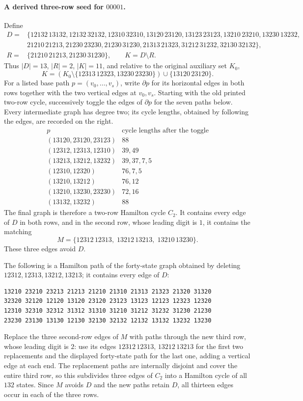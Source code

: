 \paragraph{A derived three-row seed for $00001$.}
Define
\[
\begin{split}
D={}&\{12132\,13132,12132\,32132,12310\,32310,
13120\,23120,13123\,23123,13210\,23210,13230\,13232,\\
&21210\,21213,21230\,23230,21230\,31230,
21313\,21323,31212\,31232,32130\,32132\},\\
R={}&\{21210\,21213,21230\,31230\},\qquad K=D\setminus R.
\end{split}
\]
Thus $|D|=13$, $|R|=2$, $|K|=11$, and relative to the original
auxiliary set $K_0$,
\[
K=(K_0\setminus\{12313\,12323,13230\,23230\})
   \cup\{13120\,23120\}.
\]
For a listed base path $p=(v_0,\ldots,v_s)$, write $\partial p$
for its horizontal edges in both rows together with the two
vertical edges at $v_0,v_s$. Starting with the old printed two-row
cycle, successively toggle the edges of $\partial p$ for the seven
paths below. Every intermediate graph has degree two; its cycle
lengths, obtained by following the edges, are recorded on the right.
\[
\begin{array}{l|l}
p&\text{cycle lengths after the toggle}\\
\hline
(13120,23120,23123)&88\\
(12312,12313,12310)&39,49\\
(13213,13212,13232)&39,37,7,5\\
(12310,12320)&76,7,5\\
(13210,13212)&76,12\\
(13210,13230,23230)&72,16\\
(13132,13232)&88
\end{array}
\]
The final graph is therefore a two-row Hamilton cycle $C_2$.
It contains every edge of $D$ in both rows, and in the second row,
whose leading digit is $1$, it contains the matching
\[
M=\{12312\,12313,\;13212\,13213,\;13210\,13230\}.
\]
These three edges avoid $D$.

The following is a Hamilton path of the forty-state graph obtained
by deleting $12312,12313,13212,13213$; it contains every edge of $D$:
\begin{verbatim}
13210 23210 23213 21213 21210 21310 21313 21323 21320 31320
32320 32120 12120 13120 23120 23123 13123 12123 12323 12320
12310 32310 32312 31312 31310 31210 31212 31232 31230 21230
23230 23130 13130 12130 32130 32132 12132 13132 13232 13230
\end{verbatim}
Replace the three second-row edges of $M$ with paths through the
new third row, whose leading digit is $2$: use its edges
$12312\,12313$, $13212\,13213$ for the first two replacements and
the displayed forty-state path for the last one, adding a vertical
edge at each end. The replacement paths are internally disjoint
and cover the entire third row, so this subdivides three edges of
$C_2$ into a Hamilton cycle of all $132$ states. Since $M$ avoids
$D$ and the new paths retain $D$, all thirteen edges occur in
each of the three rows.

